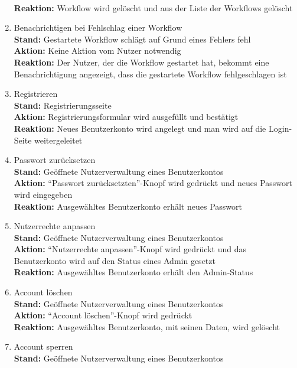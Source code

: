 \begin{enumerate}
        \\ \textbf{Reaktion:} \gls{Workflow} wird gelöscht und aus der Liste der Workflows gelöscht    
    \item Benachrichtigen bei Fehlschlag einer \gls{Workflow}
        \\ \textbf{Stand:} Gestartete \gls{Workflow} schlägt auf Grund eines Fehlers fehl
        \\ \textbf{Aktion:} Keine Aktion vom \gls{Nutzer} notwendig
        \\ \textbf{Reaktion:} Der \gls{Nutzer}, der die \gls{Workflow} gestartet hat, bekommt eine Benachrichtigung angezeigt, dass die gestartete \gls{Workflow} fehlgeschlagen ist
    \item Registrieren
        \\ \textbf{Stand:} Registrierungsseite
        \\ \textbf{Aktion:} Registrierungsformular wird ausgefüllt und bestätigt
        \\ \textbf{Reaktion:} Neues Benutzerkonto wird angelegt und man wird auf die Login-Seite weitergeleitet
    \item Passwort zurücksetzen
        \\ \textbf{Stand:} Geöffnete Nutzerverwaltung eines Benutzerkontos
        \\ \textbf{Aktion:} \enquote{Passwort zurücksetzten}-Knopf wird gedrückt und neues Passwort wird eingegeben
        \\ \textbf{Reaktion:} Ausgewähltes Benutzerkonto erhält neues Passwort
    \item Nutzerrechte anpassen
        \\ \textbf{Stand:} Geöffnete Nutzerverwaltung eines Benutzerkontos
        \\ \textbf{Aktion:} \enquote{Nutzerrechte anpassen}-Knopf wird gedrückt und das Benutzerkonto wird auf den Status eines \Gls{Admin} gesetzt
        \\ \textbf{Reaktion:} Ausgewähltes Benutzerkonto erhält den \Gls{Admin}-Status
    \item Account löschen
        \\ \textbf{Stand:} Geöffnete Nutzerverwaltung eines Benutzerkontos
        \\ \textbf{Aktion:} \enquote{Account löschen}-Knopf wird gedrückt
        \\ \textbf{Reaktion:} Ausgewähltes Benutzerkonto, mit seinen Daten, wird gelöscht
    \item Account sperren
        \\ \textbf{Stand:} Geöffnete Nutzerverwaltung eines Benutzerkontos

\end{enumerate}
